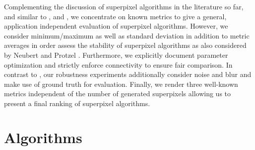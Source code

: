 \documentclass[5p]{elsarticle}
\begin{document}
Complementing the discussion of superpixel algorithms in the literature so far, and
similar to \cite{SchickFischerStiefelhagen:2012}, \cite{AchantaShajiSmithLucchiFuaSuesstrunk:2012}
and \cite{NeubertProtzel:2012}, we concentrate on known metrics
to give a general, application independent evaluation of superpixel algorithms. However, we
consider minimum/maximum as well as standard deviation in addition to metric
averages in order assess the stability of superpixel algorithms as also considered
by Neubert and Protzel \cite{NeubertProtzel:2012,NeubertProtzel:2013}.
Furthermore, we explicitly document parameter optimization
and strictly enforce connectivity to ensure fair comparison. In contrast to \cite{NeubertProtzel:2012},
our robustness experiments additionally consider noise and blur and make use of ground truth for evaluation.
Finally, we render three well-known metrics independent of the number of generated
superpixels allowing us to present a final ranking of superpixel algorithms.

\section{Algorithms}
\label{sec:algorithms}

\newcommand{\algobox}[9]{%
    \begin{framed}
        \vskip -0.15cm
        \hskip -0.7cm
        \begin{minipage}[t]{0.25\textwidth}
            \vspace{-0.2cm}
            \def\temp{#9}\ifx\temp\empty
                \texttt{[image: \#1]}
            \else
                \texttt{[image: \#1]}
            \fi
        \end{minipage}
        \hskip 0.15cm
        \begin{minipage}[t]{0.75\textwidth}
            {\scriptsize
                {\tiny Name}\\[-4px]
                #2\\[-2px]
                {\tiny Reference (Google Scholar Citations)\hfill Color}\\[-4px]
                #3\\[-2px]
            }
        \end{minipage}
        \vskip -0.15cm
        \hskip -0.7cm
        \begin{minipage}[t]{1.025\textwidth}
            {\tiny Implementation \hfill Superpixels Compactness Iterations}\\[-4px]
            {\scriptsize #4 \hfill #5\hskip 1.3cm#7\hskip 1.2cm#6}\\[-2px]
            \def\temp{#8}\ifx\temp\empty

            \else
                {\tiny Description}\\[-4px]
                {\scriptsize #8}
            \fi
        \end{minipage}
        \def\temp{#8}\ifx\temp\empty
            \vskip -0.5cm
        \else
            \vskip -0.2cm
        \fi
    \end{framed}
    \vspace{-0.65cm}
}
\end{document}

